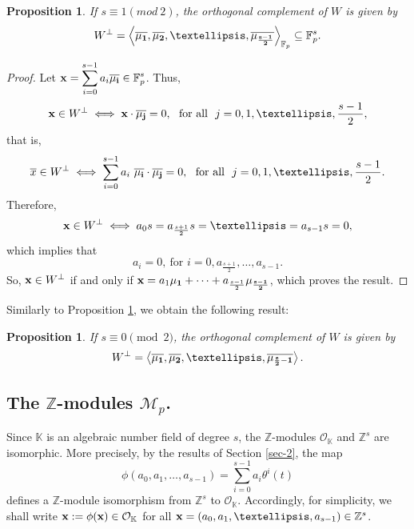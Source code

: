 \documentclass[10pt,a4paper]{amsart}
\newtheorem{proposition}[theorem]{Proposition}
\begin{document}
\begin{proposition}\label{prop-2} If $s\equiv 1(mod\ 2)$, the orthogonal complement of $W$ is given by $$W^{\perp} = \left\langle\overline{\bf \mu_1},\overline{\bf \mu_2},\ldots,\overline{\bf \mu_{\frac{s-1}{2}}}\right\rangle_{\mathbb{F}_p} \subseteq\mathbb{F}_p^s.$$ \end{proposition}
\begin{proof} Let ${\bf x} = \displaystyle \sum_{i=0}^{s-1}a_i\overline{\bf \mu_i}\in \mathbb{F}_p^s$. Thus,  
\[ {\bf x}\in W^{\perp} \iff {\bf x}\cdot \overline{\bf \mu_j}=0, \ \ \mbox{for all} \ \ j=0,1,\ldots,\frac{s-1}{2}, \] that is, \[ \overline{x}\in W^{\perp} \iff \sum_{i=0}^{s-1} a_i\ \overline{\bf \mu_i}\cdot \overline{\bf\mu_j}=0, \ \ \mbox{for all} \ \ j=0,1,\ldots,\frac{s-1}{2}. \] Therefore, \[ {\bf x}\in W^{\perp}
\iff a_0s=a_{\frac{s+1}{2}}s = \ldots = a_{s-1}s =0, \] which implies that \[ a_i=0,~\mbox{for } i=0,a_{\frac{s+1}{2}},\ldots,a_{s-1}. \] So, ${\bf x}\in W^\perp$ if and only if ${\bf x}=a_1{\bf\mu_1}+\cdots+a_{\frac{s-1}{2}}{\bf \mu_{\frac{s-1}{2}}}$, which proves the result. \end{proof}

Similarly to Proposition \ref{prop-2}, we obtain the following result:

\begin{proposition}
    \label{cor-0} If $s\equiv 0\pmod 2$, the orthogonal complement of $W$ is given by $$W^{\perp} = \left<\overline{\bf \mu_1},\overline{\bf \mu_2},\ldots,\overline{\bf \mu_{\frac{s}{2}-1}}\right>.$$
\end{proposition} 

\subsection{The $\mathbb{Z}$-modules $\mathcal{M}_p$.}\label{subsection_Mp}

Since $\mathbb{K}$ is an algebraic number field of degree $s$, the $\mathbb{Z}$-modules $\mathcal{O}_\mathbb{K}$ and $\mathbb{Z}^s$ are isomorphic. More precisely, by the results of Section \ref{sec-2}, the map
\begin{equation}\label{eq_iso}
  \phi\left(a_0,a_1,\ldots,a_{s-1}\right)=\sum_{i=0}^{s-1} a_i\theta^i(t)  
\end{equation}
defines a $\mathbb{Z}$-module isomorphism from $\mathbb{Z}^s$ to $\mathcal{O}_\mathbb{K}$. Accordingly, for simplicity, we shall write ${\bf x}:=\phi({\bf x})\in\mathcal{O}_\mathbb{K}$ for all ${\bf x}=(a_0,a_1,\ldots,a_{s-1})\in\mathbb{Z}^s$.
\end{document}
